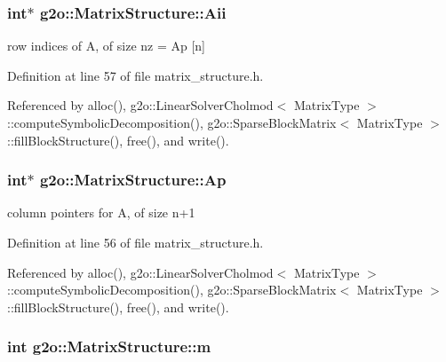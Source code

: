 \subsubsection[{\texorpdfstring{Aii}{Aii}}]{\setlength{\rightskip}{0pt plus 5cm}int$\ast$ g2o\+::\+Matrix\+Structure\+::\+Aii}\hypertarget{classg2o_1_1MatrixStructure_a7984bf429b8694070ab8db5f5852d8bb}{}\label{classg2o_1_1MatrixStructure_a7984bf429b8694070ab8db5f5852d8bb}


row indices of A, of size nz = Ap \mbox{[}n\mbox{]} 



Definition at line 57 of file matrix\+\_\+structure.\+h.



Referenced by alloc(), g2o\+::\+Linear\+Solver\+Cholmod$<$ Matrix\+Type $>$\+::compute\+Symbolic\+Decomposition(), g2o\+::\+Sparse\+Block\+Matrix$<$ Matrix\+Type $>$\+::fill\+Block\+Structure(), free(), and write().

\subsubsection[{\texorpdfstring{Ap}{Ap}}]{\setlength{\rightskip}{0pt plus 5cm}int$\ast$ g2o\+::\+Matrix\+Structure\+::\+Ap}\hypertarget{classg2o_1_1MatrixStructure_aeeff8e78fb766a433aecbfda4a2e3ffc}{}\label{classg2o_1_1MatrixStructure_aeeff8e78fb766a433aecbfda4a2e3ffc}


column pointers for A, of size n+1 



Definition at line 56 of file matrix\+\_\+structure.\+h.



Referenced by alloc(), g2o\+::\+Linear\+Solver\+Cholmod$<$ Matrix\+Type $>$\+::compute\+Symbolic\+Decomposition(), g2o\+::\+Sparse\+Block\+Matrix$<$ Matrix\+Type $>$\+::fill\+Block\+Structure(), free(), and write().

\subsubsection[{\texorpdfstring{m}{m}}]{\setlength{\rightskip}{0pt plus 5cm}int g2o\+::\+Matrix\+Structure\+::m}\hypertarget{classg2o_1_1MatrixStructure_a9cceed2097dcbaa27ed88b7005440616}{}\label{classg2o_1_1MatrixStructure_a9cceed2097dcbaa27ed88b7005440616}


